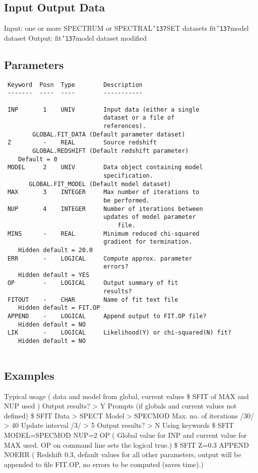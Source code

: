 \documentclass{book}
\renewcommand{\_}{{\tt\char'137}}     %
\begin{document}
\subsection{Input Output Data}
Input: one or more SPECTRUM or SPECTRAL\_SET datasets
fit\_model dataset
Output: fit\_model dataset modified
\subsection{Parameters}
\begin{verbatim}
 Keyword  Posn  Type        Description
 -------  ----  ----        -----------
 
 INP       1    UNIV        Input data (either a single
                            dataset or a file of
                            references).
        GLOBAL.FIT_DATA (Default parameter dataset)
 Z         -    REAL        Source redshift
        GLOBAL.REDSHIFT (Default redshift parameter)
    Default = 0
 MODEL     2    UNIV        Data object containing model
                            specification.
       GLOBAL.FIT_MODEL (Default model dataset)
 MAX       3    INTEGER     Max number of iterations to
                            be performed.
 NUP       4    INTEGER     Number of iterations between
                            updates of model parameter
                                file.
 MINS      -    REAL        Minimum reduced chi-squared
                            gradient for termination.
    Hidden default = 20.0
 ERR       -    LOGICAL     Compute approx. parameter
                            errors?
    Hidden default = YES
 OP        -    LOGICAL     Output summary of fit
                            results?
 FITOUT    -    CHAR        Name of fit text file
    Hidden default = FIT.OP
 APPEND    -    LOGICAL     Append output to FIT.OP file?
    Hidden default = NO
 LIK       -    LOGICAL     Likelihood(Y) or chi-squared(N) fit?
    Hidden default = NO
 
\end{verbatim}\subsection{Examples}
Typical usage
( data and model from global, current values
\$ SFIT of MAX and NUP used )
Output results? > Y
Prompts (if globals and current values not defined)
\$ SFIT
Data > SPECT
Model > SPECMOD
Max. no. of iterations /30/ > 40
Update interval /3/ > 5
Output results? > N
Using keywords
\$ SFIT MODEL=SPECMOD NUP=2 OP
( Global value for INP and current value for MAX used.
OP on command line sets the logical true.)
\$ SFIT Z=0.3 APPEND NOERR
( Redshift 0.3, default values for all other parameters,
output will be appended to file FIT.OP, no errors to be
computed (saves time).)
\end{document}
